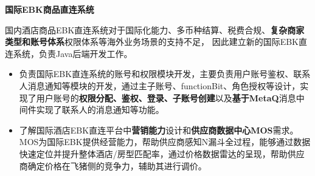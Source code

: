 \documentclass{resume}
\begin{document}
  \textbf{国际EBK商品直连系统} 
   \begin{spacing}{1.2} 
  国内酒店商品EBK直连系统对于国际化能力、多币种结算、税费合规、\textbf{复杂商家类型和账号体系}权限体系等海外业务场景的支持不足，
  因此建立新的国际EBK直连系统，负责Java后端开发工作。

  \begin{itemize}
    \item 负责国际EBK直连系统的账号和权限模块开发，主要负责用户账号鉴权、联系人消息通知等模块的开发，通过主子账号、functionBit、角色授权等设计，实现了用户账号的\textbf{权限分配、鉴权、登录、子账号创建}以及\textbf{基于MetaQ}消息中间件实现了联系人的消息通知等功能。
    \item 了解国际酒店EBK直连平台中\textbf{营销能力}设计和\textbf{供应商数据中心MOS}需求。MOS为国际EBK提供经营能力，帮助供应商感知N漏斗全过程，能够通过数据快速定位并提升整体酒店/房型匹配率，通过价格数据雷达的呈现，帮助供应商确定价格在飞猪侧的竞争力，辅助其进行调价。
  \end{itemize}
  \end{spacing}

\end{document}
